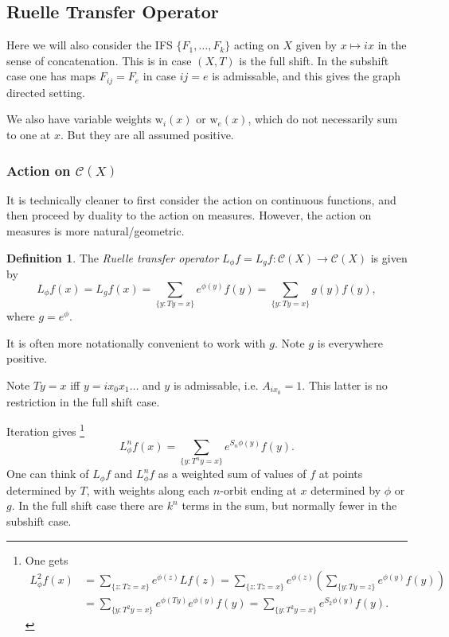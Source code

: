 \documentclass[a4paper]{amsart}
\theoremstyle{plain}
\theoremstyle{definition}
\newtheorem{definition}[theorem]{Definition}%
\theoremstyle{remark}
\begin{document}
\subsection{Ruelle Transfer Operator}  \label{rto} Here we will also consider the IFS $ \{F_1,\dots ,F_k\} $ acting on $ X $ 
given by $ x \mapsto ix $ in the sense of concatenation.  This is in case $ (X,T) $ is the full shift.
In the subshift case one has maps $ F_{ij}  = F_e$ in case $ ij =e $ is admissable, and this gives the graph directed setting. 

We also have variable weights $ \text{w}_i(x) $ or $ \text{w}_e(x) $, which do not necessarily sum to one at $ x $.  But they are all assumed positive.

\subsubsection{Action on $ \mathcal{C} (X) $} \label{secac} It is technically cleaner to first consider the action on continuous functions, and then proceed by duality to the action on measures.  However, the action on measures is more natural/geometric.

\begin{definition} The \emph{Ruelle transfer operator} $ L_\phi f=L_g f: \mathcal{C} (X) \to \mathcal{C} (X) $ is given by
\[
L_\phi f(x) = L_g f(x) = \sum_{\{y:Ty = x\}} e^{\phi(y) } f(y) = \sum_{\{y:Ty = x\}} g(y) f(y),
\]
where $ g  =  e^{\phi  }$. 
\end{definition}

  It is often more notationally convenient to work with $ g$.  Note  $ g $ is everywhere positive. 
  
  Note $ Ty = x $ iff $ y=ix_0x_1\dots $ and $ y $ is admissable, i.e. $ A_{ix_0} = 1$.   This latter is no restriction in the full shift case.
  
  Iteration gives%
  \footnote{ One gets
 \begin{align*}
  L_\phi^2 f(x) &= \sum_{\{z:Tz=x\}} e^{\phi(z)}Lf(z) 
   =  \sum_{\{z:Tz=x\}} e^{\phi(z)} \left(  \sum_{\{y:Ty=z\}} e^{\phi(y)} f(y) \right) \\
  &=   \sum_{\{y:T^2y=x\}} e^{\phi(Ty)} e^{\phi(y)} f(y)   
   = \sum_{\{y:T^2y=x\}} e^{S_2\phi(y)}   f(y) .
  \end{align*} 
  }  
  \[ 
  L^n_\phi f (x) =  \sum_{\{y:T^ny = x\}} e^{S_n\phi(y) } f(y) .
  \]
  One can think of $ L_\phi f $ and $ L^n_\phi f $ as a weighted sum of values of $ f $  at points  determined by $ T $, with weights along each $ n $-orbit ending at $ x $ determined by $ \phi $  or $ g $.  In the full shift case there are $ k^n $ terms in the sum, but normally fewer in the subshift case. 
\end{document}
